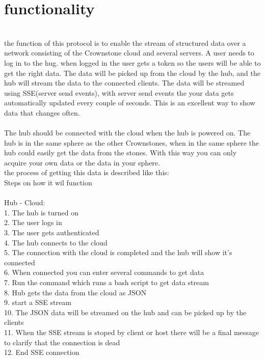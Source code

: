 \documentclass{article}
\begin{document}
\section{functionality} 
 \\
the function of this protocol is to enable the stream of structured data over a network consisting of the Crownstone cloud and several servers. A user needs to log in to the hug. when logged in the user gets a token so the users will be able to get the right data. The data will be picked up from the cloud by the hub, and the hub will stream the data to the connected clients. The data will be streamed using SSE(server send events), with server send events the your data gets automatically updated  every couple of seconds. This is an excellent way to show data that changes often.\\
\\
The hub should be connected with the cloud when the hub is powered on. The hub is in the same sphere as  the other Crownstones, when in the same sphere the hub could easily get the data from the stones. With this way you can only acquire your own data or the data in your sphere.  
\\
the process of getting this data is described like this:\\
Steps on how it wil function \\
\\
Hub  - Cloud: \\
1. The hub is turned on\\
2. The user logs in\\
3. The user gets authenticated\\
4. The hub connects to the cloud\\
5. The connection with the cloud is completed and the hub will show it's connected\\
6. When connected you can enter several commands to get data\\
7. Run the command which runs a bash script to get data stream\\
8. Hub gets the data from the cloud as JSON\\
9. start a SSE stream \\
10. The JSON data will be streamed on the hub and can be picked up by the clients\\
11. When the SSE stream is stoped by client or host there will be a final message to clarify that the connection is dead\\
12. End SSE connection\\
\end{document}
